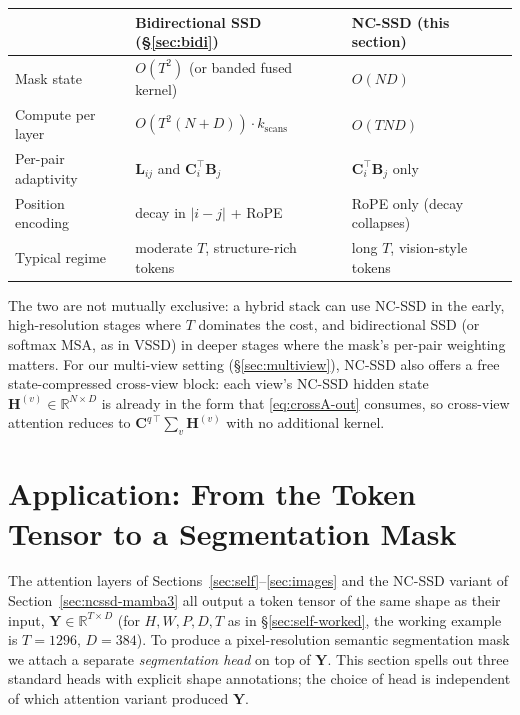 \documentclass[11pt,a4paper]{article}
\begin{document}
\begin{center}
\begin{tabular}{|l|l|l|}
\hline
 & \textbf{Bidirectional SSD} (\S\ref{sec:bidi}) & \textbf{NC-SSD} (this section)\\ \hline
Mask state         & $O(T^2)$ (or banded fused kernel) & $O(ND)$ \\ \hline
Compute per layer  & $O(T^2(N+D))\cdot k_{\text{scans}}$ & $O(TND)$ \\ \hline
Per-pair adaptivity & $\bm{L}_{ij}$ and $\bm{C}_i^\top\bm{B}_j$ & $\bm{C}_i^\top\bm{B}_j$ only \\ \hline
Position encoding   & decay in $|i-j|$ + RoPE   & RoPE only (decay collapses) \\ \hline
Typical regime      & moderate $T$, structure-rich tokens & long $T$, vision-style tokens \\ \hline
\end{tabular}
\end{center}
The two are not mutually exclusive: a hybrid stack can use NC-SSD in
the early, high-resolution stages where $T$ dominates the cost, and
bidirectional SSD (or softmax MSA, as in VSSD) in deeper stages where
the mask's per-pair weighting matters. For our multi-view setting
(\S\ref{sec:multiview}), NC-SSD also offers a free state-compressed
cross-view block: each view's NC-SSD hidden state
$\bm{H}^{(v)}\in\mathbb{R}^{N\times D}$ is already in the form that
\eqref{eq:crossA-out} consumes, so cross-view attention reduces to
$\bm{C}^{q\,\top}\sum_v \bm{H}^{(v)}$ with no additional kernel.

\section{Application: From the Token Tensor to a Segmentation Mask}
\label{sec:seg}

The attention layers of Sections~\ref{sec:self}--\ref{sec:images} and
the NC-SSD variant of Section~\ref{sec:ncssd-mamba3} all output a
token tensor of the same shape as their input, $\bm{Y}\in
\mathbb{R}^{T\times D}$ (for $H,W,P,D,T$ as in
\S\ref{sec:self-worked}, the working example is
$T\!=\!1296,\,D\!=\!384$). To produce a pixel-resolution semantic
segmentation mask we attach a separate \emph{segmentation head} on top
of $\bm{Y}$. This section spells out three standard heads with
explicit shape annotations; the choice of head is independent of
which attention variant produced $\bm{Y}$.
\end{document}
